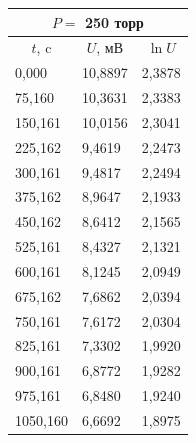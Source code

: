 \documentclass[a4paper,12pt]{article} %
\begin{document}
\begin{enumerate}
\begin{table}[h!]
	\begin{tabular}{lll}
		\hline
		\multicolumn{3}{|c|}{$P = $ 250 торр}                                                         \\ \hline
		\multicolumn{1}{|c|}{$t$, c}   & \multicolumn{1}{c|}{$U$, мВ} & \multicolumn{1}{c|}{$\ln{U}$} \\ \hline
		\multicolumn{1}{|l|}{0,000}    & \multicolumn{1}{l|}{10,8897} & \multicolumn{1}{l|}{2,3878}   \\ \hline
		\multicolumn{1}{|l|}{75,160}   & \multicolumn{1}{l|}{10,3631} & \multicolumn{1}{l|}{2,3383}   \\ \hline
		\multicolumn{1}{|l|}{150,161}  & \multicolumn{1}{l|}{10,0156} & \multicolumn{1}{l|}{2,3041}   \\ \hline
		\multicolumn{1}{|l|}{225,162}  & \multicolumn{1}{l|}{9,4619}  & \multicolumn{1}{l|}{2,2473}   \\ \hline
		\multicolumn{1}{|l|}{300,161}  & \multicolumn{1}{l|}{9,4817}  & \multicolumn{1}{l|}{2,2494}   \\ \hline
		\multicolumn{1}{|l|}{375,162}  & \multicolumn{1}{l|}{8,9647}  & \multicolumn{1}{l|}{2,1933}   \\ \hline
		\multicolumn{1}{|l|}{450,162}  & \multicolumn{1}{l|}{8,6412}  & \multicolumn{1}{l|}{2,1565}   \\ \hline
		\multicolumn{1}{|l|}{525,161}  & \multicolumn{1}{l|}{8,4327}  & \multicolumn{1}{l|}{2,1321}   \\ \hline
		\multicolumn{1}{|l|}{600,161}  & \multicolumn{1}{l|}{8,1245}  & \multicolumn{1}{l|}{2,0949}   \\ \hline
		\multicolumn{1}{|l|}{675,162}  & \multicolumn{1}{l|}{7,6862}  & \multicolumn{1}{l|}{2,0394}   \\ \hline
		\multicolumn{1}{|l|}{750,161}  & \multicolumn{1}{l|}{7,6172}  & \multicolumn{1}{l|}{2,0304}   \\ \hline
		\multicolumn{1}{|l|}{825,161}  & \multicolumn{1}{l|}{7,3302}  & \multicolumn{1}{l|}{1,9920}   \\ \hline
		\multicolumn{1}{|l|}{900,161}  & \multicolumn{1}{l|}{6,8772}  & \multicolumn{1}{l|}{1,9282}   \\ \hline
		\multicolumn{1}{|l|}{975,161}  & \multicolumn{1}{l|}{6,8480}  & \multicolumn{1}{l|}{1,9240}   \\ \hline
		\multicolumn{1}{|l|}{1050,160} & \multicolumn{1}{l|}{6,6692}  & \multicolumn{1}{l|}{1,8975}   \\ \hline

\end{tabular}
\end{table}
\end{enumerate}
\end{document}

